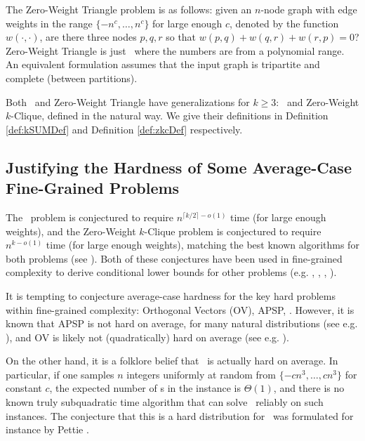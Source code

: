 The Zero-Weight Triangle problem is as follows: given an $n$-node graph with edge weights in the range $\{-n^c,\ldots,n^c\}$ for large enough $c$, denoted by the function $w(\cdot, \cdot)$, are there three nodes $p,q,r$ so that $w(p,q)+w(q,r)+w(r,p)=0$? Zero-Weight Triangle is just \zThclique~where the numbers are from a polynomial range.
An equivalent formulation assumes that the input graph is tripartite and complete (between partitions).

Both \ThSum~and Zero-Weight Triangle have generalizations for $k\geq 3$: \kSum~and Zero-Weight $k$-Clique, defined in the natural way. We give their definitions in Definition \ref{def:kSUMDef} and Definition \ref{def:zkcDef} respectively. %

\subsection{Justifying the Hardness of Some Average-Case Fine-Grained Problems}
The \kSum~problem is conjectured to require $n^{\lceil k/2\rceil-o(1)}$ time (for large enough weights), and the Zero-Weight $k$-Clique problem is conjectured to require $n^{k-o(1)}$ time (for large enough weights), matching the best known algorithms for both problems (see \cite{icm-survey}). Both of these conjectures have been used in fine-grained complexity to derive conditional lower bounds for other problems (e.g. \cite{BackursT16},  \cite{abboud2014consequences}, \cite{sparseGraphsLVWW}, \cite{treeEditDistance}).

It is tempting to conjecture average-case hardness for the key hard problems within fine-grained complexity: Orthogonal Vectors (OV), APSP, \ThSum. However, it is known that APSP is not hard on average, for many natural distributions (see e.g. \cite{PeresSSZ13,averageAPSP}), and OV is likely not (quadratically) hard on average (see e.g. \cite{KW17}).

On the other hand, it is a folklore belief that \ThSum~is actually hard on average.
In particular, if one samples $n$ integers uniformly at random from $\{-cn^3,\ldots,cn^3\}$ for constant $c$, the expected number of \ThSum s in the instance is $\Theta(1)$, and there is no known truly subquadratic time algorithm that can solve \ThSum~reliably on such instances. The conjecture that this is a hard distribution for \ThSum~was formulated for instance by Pettie \cite{avgCase3Sum}. 

